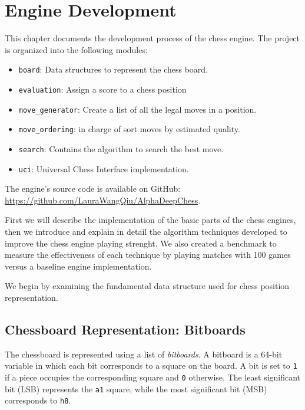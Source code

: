 \chapter{Engine Development}
\label{cap:descripcionTrabajo}

\noindent This chapter documents the development process of the chess engine. The project is organized into the following
 modules:

\begin{itemize}
    \item \texttt{board}: Data structures to represent the chess board.
    \item \texttt{evaluation}: Assign a score to a chess position
    \item \texttt{move\_generator}: Create a list of all the legal moves in a position.
    \item \texttt{move\_ordering}: in charge of sort moves by estimated quality.
    \item \texttt{search}: Contains the algorithm to search the best move.
    \item \texttt{uci}: Universal Chess Interface implementation.
\end{itemize}
\vspace{1em}

\noindent The engine's source code is available on GitHub:\\
\scriptsize\url{https://github.com/LauraWangQiu/AlphaDeepChess}\normalsize. 

\vspace{2em}

\noindent First we will describe the implementation of the basic parts of the chess engines, then we introduce and explain in detail the algorithm techniques developed to improve the chess engine playing strenght. We also created a benchmark to measure the effectiveness of each technique by playing matches with 100 games versus a baseline engine implementation.

\vspace{2em}

\noindent We begin by examining the fundamental data structure used for chess position representation.

\newpage

\section{Chessboard Representation: Bitboards}

\noindent The chessboard is represented using a list of \textit{bitboards}. A bitboard is a 64-bit variable in which each bit corresponds to a square on the board. A bit is set to \texttt{1} if a piece occupies the corresponding square and \texttt{0} otherwise. The least significant bit (LSB) represents the \texttt{a1} square, while the most significant bit (MSB) corresponds to \texttt{h8}. ~\cite{Bitboards}
 
